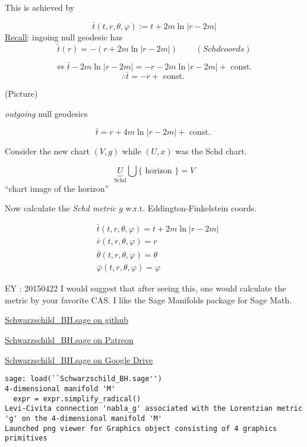 This is achieved by 

\[
\bar{t}(t,r,\theta, \varphi) := t + 2m \ln{ | r-2m | }
\]
\underline{Recall}: ingoing null geodesic has 
\[
\widetilde{t}(r) = -(r + 2m \ln{ |r-2m |} )  \quad \quad \, (Schd coords)
\]

\[
\Longleftrightarrow \bar{t} - 2m \ln{ |r-2m |} = -r - 2m \ln{ |r-2m |} + \text{ const. }
\]
\[
\therefore \bar{t} = -r + \text{ const. }
\]

(Picture)

\emph{outgoing} null geodesics

\[
\bar{t} = r + 4 m \ln{ |r - 2m| } + \text{ const. }
\]

Consider the new chart $(V,g)$ while $(U,x)$ was the Schd chart.

\[
\underbrace{U}_{\text{Schd}} \bigcup \lbrace \text{ horizon } \rbrace = V
\]
``chart image of the horizon''

Now calculate the \emph{Schd metric $g$ } w.r.t. Eddington-Finkelstein coords.

\[
\begin{aligned}
  & \bar{t}(t,r,\theta,\varphi) = t + 2m\ln{ |r -2m | } \\
  & \bar{r}(t,r,\theta,\varphi) = r \\
  & \bar{\theta}(t,r,\theta,\varphi) = \theta \\
  & \bar{\varphi}(t,r,\theta,\varphi) = \varphi
\end{aligned}
\]

EY : 20150422 I would suggest that after seeing this, one would calculate the metric by your favorite CAS.  I like the Sage Manifolds package for Sage Math.  

\href{https://github.com/ernestyalumni/diffgeo-by-sagemnfd/blob/master/Schwarzschild_BH.sage}{Schwarzschild\_BH.sage on github}

\href{https://www.patreon.com/file?s=645287&h=2254352&i=108637}{Schwarzschild\_BH.sage on Patreon}

\href{https://drive.google.com/file/d/0B1H1Ygkr4EWJdllTR3czQU9DeW8/view?usp=sharing}{Schwarzschild\_BH.sage on Google Drive}

\begin{lstlisting}[frame=single]
sage: load(``Schwarzschild_BH.sage'')
4-dimensional manifold 'M'
  expr = expr.simplify_radical()
Levi-Civita connection 'nabla_g' associated with the Lorentzian metric 'g' on the 4-dimensional manifold 'M'
Launched png viewer for Graphics object consisting of 4 graphics primitives
\end{lstlisting}

